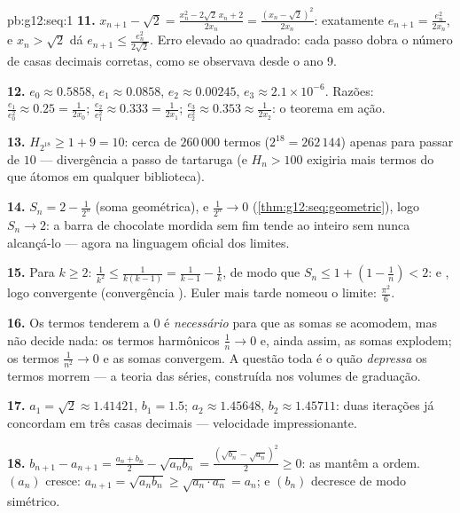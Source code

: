\begin{solution}{pb:g12:seq:1}
\textbf{11.} $x_{n+1} - \sqrt2 = \frac{x_n^2 - 2\sqrt2\,x_n +
2}{2x_n} = \frac{(x_n - \sqrt2)^2}{2x_n}$: exatamente
$e_{n+1} = \frac{e_n^2}{2x_n}$, e $x_n > \sqrt2$ dá
$e_{n+1} \leq \frac{e_n^2}{2\sqrt2}$. Erro elevado ao quadrado:
cada passo dobra o número de casas decimais corretas, como se
observava desde o ano 9.

\textbf{12.} $e_0 \approx 0.5858$, $e_1 \approx 0.0858$,
$e_2 \approx 0.00245$, $e_3 \approx 2.1 \times 10^{-6}$.
Razões: $\frac{e_1}{e_0^2} \approx 0.25 = \frac{1}{2x_0}$;
$\frac{e_2}{e_1^2} \approx 0.333 = \frac{1}{2x_1}$;
$\frac{e_3}{e_2^2} \approx 0.353 \approx \frac{1}{2x_2}$: o
teorema em ação.

\textbf{13.} $H_{2^{18}} \geq 1 + 9 = 10$: cerca de
$260\,000$ termos ($2^{18} = 262\,144$) apenas para passar de
$10$ --- divergência a passo de tartaruga (e $H_n > 100$
exigiria mais termos do que átomos em qualquer biblioteca).

\textbf{14.} $S_n = 2 - \frac{1}{2^n}$ (soma geométrica), e
$\frac{1}{2^n} \to 0$ (\cref{thm:g12:seq:geometric}), logo
$S_n \to 2$: a barra de chocolate mordida sem fim tende ao
inteiro sem nunca alcançá-lo --- agora na linguagem oficial dos
limites.

\textbf{15.} Para $k \geq 2$:
$\frac{1}{k^2} \leq \frac{1}{k(k-1)} = \frac{1}{k-1} -
\frac1k$, de modo que
$S_n \leq 1 + \left(1 - \frac1n\right) < 2$:  e
, logo convergente (convergência
). Euler mais tarde nomeou o limite:
$\frac{\pi^2}{6}$.

\textbf{16.} Os termos tenderem a $0$ é \emph{necessário} para
que as somas se acomodem, mas não decide nada: os termos
harmônicos $\frac1n \to 0$ e, ainda assim, as somas explodem;
os termos $\frac{1}{n^2} \to 0$ e as somas convergem. A questão
toda é o quão \emph{depressa} os termos morrem --- a teoria das
séries, construída nos volumes de graduação.

\textbf{17.} $a_1 = \sqrt2 \approx 1.41421$, $b_1 = 1.5$;
$a_2 \approx 1.45648$, $b_2 \approx 1.45711$: duas iterações já
concordam em três casas decimais --- velocidade impressionante.

\textbf{18.} $b_{n+1} - a_{n+1} = \frac{a_n + b_n}{2} -
\sqrt{a_n b_n} = \frac{(\sqrt{b_n} - \sqrt{a_n})^2}{2} \geq
0$: as  mantêm a ordem. $(a_n)$ cresce:
$a_{n+1} = \sqrt{a_n b_n} \geq \sqrt{a_n \cdot a_n} = a_n$; e
$(b_n)$ decresce de modo simétrico.


\end{solution}
